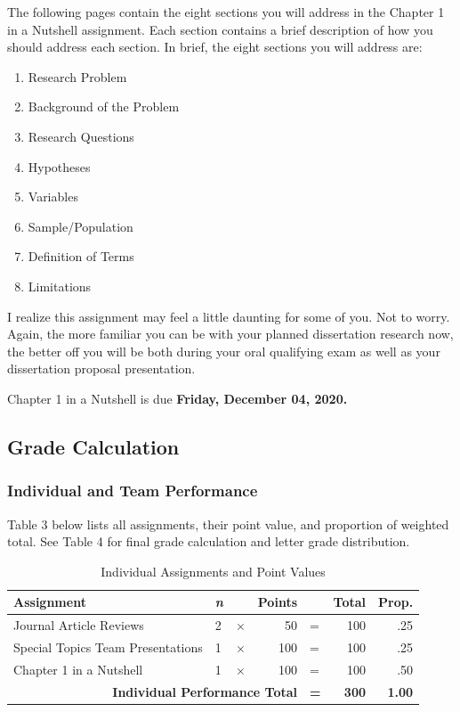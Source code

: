 \documentclass[
]{article}
\providecommand{\tightlist}{%
  \setlength{\itemsep}{0pt}\setlength{\parskip}{0pt}}
\begin{document}
The following pages contain the eight sections you will address in the
Chapter 1 in a Nutshell assignment. Each section contains a brief
description of how you should address each section. In brief, the eight
sections you will address are:

\begin{enumerate}
\def\labelenumi{\arabic{enumi}.}
\tightlist
\item
  Research Problem
\item
  Background of the Problem
\item
  Research Questions
\item
  Hypotheses
\item
  Variables
\item
  Sample/Population
\item
  Definition of Terms
\item
  Limitations
\end{enumerate}

I realize this assignment may feel a little daunting for some of you.
Not to worry. Again, the more familiar you can be with your planned
dissertation research now, the better off you will be both during your
oral qualifying exam as well as your dissertation proposal presentation.

Chapter 1 in a Nutshell is due \textbf{Friday, December 04, 2020.}

\subsection{Grade Calculation}

\subsubsection{Individual and Team Performance}

Table 3 below lists all assignments, their point value, and proportion
of weighted total. See Table 4 for final grade calculation and letter
grade distribution.

\begin{table}[H]
\centering
\caption{Individual Assignments and Point Values}
\vspace{3mm}
\label{points}
\begin{tabular}{lllrlrr}
\hline
\bf{Assignment} & \bf{\em{n}} &  & \bf{Points} &  & \bf{Total} & \bf{Prop.} \\
\hline
Journal Article Reviews & 2 & $\times$ & 50 & = & 100 & .25\\
Special Topics Team Presentations & 1 & $\times$ & 100 & = & 100 & .25\\
Chapter 1 in a Nutshell & 1 & $\times$ & 100 & = & 100 & .50 \\
\multicolumn{4}{r}{\bf{Individual Performance Total}} & {\bf{=}} & {\bf{300}} & {\bf{1.00}} \\
\hline
\end{tabular}
\label{points}
\end{table}
\end{document}
